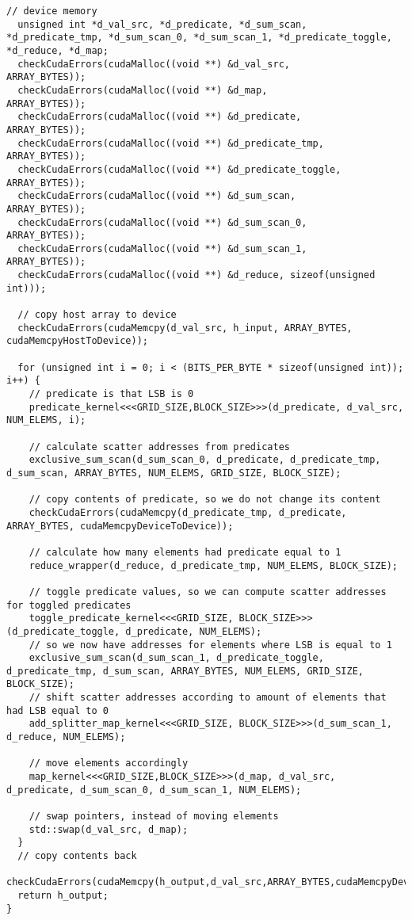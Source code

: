 \begin{lstlisting}[captionpos=t, xleftmargin=0.0pt, xrightmargin=0.0pt, caption={Radix Sort implementation}, label={lst:radix sort full}]
  // device memory
  unsigned int *d_val_src, *d_predicate, *d_sum_scan, *d_predicate_tmp, *d_sum_scan_0, *d_sum_scan_1, *d_predicate_toggle, *d_reduce, *d_map;
  checkCudaErrors(cudaMalloc((void **) &d_val_src,          ARRAY_BYTES));
  checkCudaErrors(cudaMalloc((void **) &d_map,              ARRAY_BYTES));
  checkCudaErrors(cudaMalloc((void **) &d_predicate,        ARRAY_BYTES));
  checkCudaErrors(cudaMalloc((void **) &d_predicate_tmp,    ARRAY_BYTES));
  checkCudaErrors(cudaMalloc((void **) &d_predicate_toggle, ARRAY_BYTES));
  checkCudaErrors(cudaMalloc((void **) &d_sum_scan,         ARRAY_BYTES));
  checkCudaErrors(cudaMalloc((void **) &d_sum_scan_0,       ARRAY_BYTES));
  checkCudaErrors(cudaMalloc((void **) &d_sum_scan_1,       ARRAY_BYTES));
  checkCudaErrors(cudaMalloc((void **) &d_reduce, sizeof(unsigned int)));

  // copy host array to device
  checkCudaErrors(cudaMemcpy(d_val_src, h_input, ARRAY_BYTES, cudaMemcpyHostToDevice));

  for (unsigned int i = 0; i < (BITS_PER_BYTE * sizeof(unsigned int)); i++) {
    // predicate is that LSB is 0
    predicate_kernel<<<GRID_SIZE,BLOCK_SIZE>>>(d_predicate, d_val_src, NUM_ELEMS, i);

    // calculate scatter addresses from predicates
    exclusive_sum_scan(d_sum_scan_0, d_predicate, d_predicate_tmp, d_sum_scan, ARRAY_BYTES, NUM_ELEMS, GRID_SIZE, BLOCK_SIZE);

    // copy contents of predicate, so we do not change its content
    checkCudaErrors(cudaMemcpy(d_predicate_tmp, d_predicate, ARRAY_BYTES, cudaMemcpyDeviceToDevice));

    // calculate how many elements had predicate equal to 1
    reduce_wrapper(d_reduce, d_predicate_tmp, NUM_ELEMS, BLOCK_SIZE);

    // toggle predicate values, so we can compute scatter addresses for toggled predicates
    toggle_predicate_kernel<<<GRID_SIZE, BLOCK_SIZE>>>(d_predicate_toggle, d_predicate, NUM_ELEMS);
    // so we now have addresses for elements where LSB is equal to 1
    exclusive_sum_scan(d_sum_scan_1, d_predicate_toggle, d_predicate_tmp, d_sum_scan, ARRAY_BYTES, NUM_ELEMS, GRID_SIZE, BLOCK_SIZE);
    // shift scatter addresses according to amount of elements that had LSB equal to 0
    add_splitter_map_kernel<<<GRID_SIZE, BLOCK_SIZE>>>(d_sum_scan_1, d_reduce, NUM_ELEMS);

    // move elements accordingly
    map_kernel<<<GRID_SIZE,BLOCK_SIZE>>>(d_map, d_val_src, d_predicate, d_sum_scan_0, d_sum_scan_1, NUM_ELEMS);

    // swap pointers, instead of moving elements
    std::swap(d_val_src, d_map);
  }
  // copy contents back
  checkCudaErrors(cudaMemcpy(h_output,d_val_src,ARRAY_BYTES,cudaMemcpyDeviceToHost));
  return h_output;
}
\end{lstlisting}
